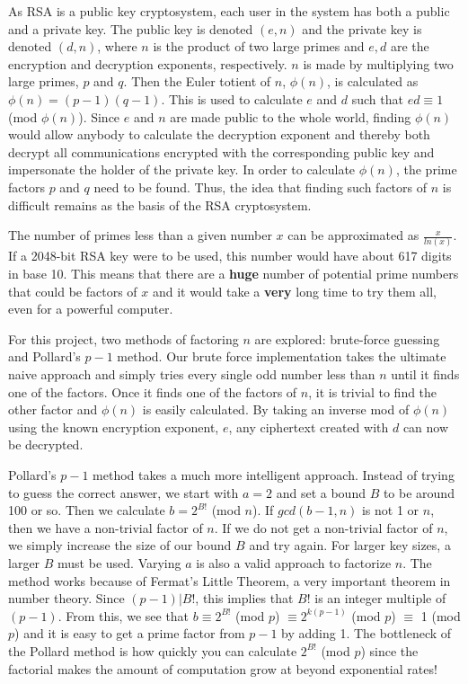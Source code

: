 \documentclass[12pt]{report}
\begin{document}
As RSA is a public key cryptosystem, each user in the system has both a public and a private key. The public key is denoted $(e,n)$ and the private key is denoted $(d,n)$, where $n$ is the product
of two large primes and $e,d$ are the encryption and decryption exponents, respectively. $n$ is made by multiplying two large primes, $p$ and $q$. Then the Euler totient of $n$, $\phi(n)$, is
calculated as $\phi(n) = (p-1)(q-1)$. This is used to calculate $e$ and $d$ such that $ed \equiv 1$ (mod $\phi(n)$). Since $e$ and $n$ are made public to the whole world, finding $\phi(n)$ would
allow anybody to calculate the decryption exponent and thereby both decrypt all communications encrypted with the corresponding public key and impersonate the holder of the private key. In order
to calculate $\phi(n)$, the prime factors $p$ and $q$ need to be found. Thus, the idea that finding such factors of $n$ is difficult remains as the basis of the RSA cryptosystem.

The number of primes less than a given number $x$ can be approximated as $\frac{x}{ln(x)}$. If a 2048-bit RSA key were to be used, this number would have about 617 digits in base 10. This means
that there are a \textbf{huge} number of potential prime numbers that could be factors of $x$ and it would take a \textbf{very} long time to try them all, even for a powerful computer.

For this project, two methods of factoring $n$ are explored: brute-force guessing and Pollard's $p-1$ method.\cite{pollard} Our brute force implementation takes the ultimate naive approach and
simply tries every single odd number less than $n$ until it finds one of the factors. Once it finds one of the factors of $n$, it is trivial to find the other factor and $\phi(n)$ is easily
calculated. By taking an inverse mod of $\phi(n)$ using the known encryption exponent, $e$, any ciphertext created with $d$ can now be decrypted.

Pollard's $p-1$ method takes a much more intelligent approach. Instead of trying to guess the correct answer, we start with $a=2$ and set a bound $B$ to be around 100 or so. Then we calculate
$b=2^{B!}$ (mod $n$). If $gcd(b-1,n)$ is not 1 or $n$, then we have a non-trivial factor of $n$. If we do not get a non-trivial factor of $n$, we simply increase the size of our bound $B$ and
try again. For larger key sizes, a larger $B$ must be used. Varying $a$ is also a valid approach to factorize $n$. The method works because of Fermat's Little Theorem, a very important theorem
in number theory. Since $(p-1)|B!$, this implies that $B!$ is an integer multiple of $(p-1)$. From this, we see that
$b \equiv 2^{B!}$ (mod $p$) $\equiv 2^{k(p-1)}$ (mod $p$) $\equiv$ 1 (mod $p$)
and it is easy to get a prime factor from $p-1$ by adding 1. The bottleneck of the Pollard method is how quickly you can calculate $2^{B!}$ (mod $p$) since the factorial makes the amount of
computation grow at beyond exponential rates!
\end{document}
